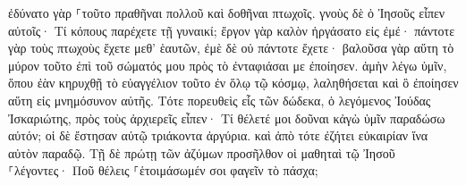 \documentclass{openreader}
\begin{document}
ἐδύνατο γὰρ ⸀τοῦτο πραθῆναι πολλοῦ καὶ δοθῆναι πτωχοῖς. 
γνοὺς δὲ ὁ Ἰησοῦς εἶπεν αὐτοῖς· Τί κόπους παρέχετε τῇ γυναικί; ἔργον γὰρ καλὸν ἠργάσατο εἰς ἐμέ· 
πάντοτε γὰρ τοὺς πτωχοὺς ἔχετε μεθ’ ἑαυτῶν, ἐμὲ δὲ οὐ πάντοτε ἔχετε· 
βαλοῦσα γὰρ αὕτη τὸ μύρον τοῦτο ἐπὶ τοῦ σώματός μου πρὸς τὸ ἐνταφιάσαι με ἐποίησεν. 
ἀμὴν λέγω ὑμῖν, ὅπου ἐὰν κηρυχθῇ τὸ εὐαγγέλιον τοῦτο ἐν ὅλῳ τῷ κόσμῳ, λαληθήσεται καὶ ὃ ἐποίησεν αὕτη εἰς μνημόσυνον αὐτῆς. 
Τότε πορευθεὶς εἷς τῶν δώδεκα, ὁ λεγόμενος Ἰούδας Ἰσκαριώτης, πρὸς τοὺς ἀρχιερεῖς 
εἶπεν· Τί θέλετέ μοι δοῦναι κἀγὼ ὑμῖν παραδώσω αὐτόν; οἱ δὲ ἔστησαν αὐτῷ τριάκοντα ἀργύρια. 
καὶ ἀπὸ τότε ἐζήτει εὐκαιρίαν ἵνα αὐτὸν παραδῷ. 
Τῇ δὲ πρώτῃ τῶν ἀζύμων προσῆλθον οἱ μαθηταὶ τῷ Ἰησοῦ ⸀λέγοντες· Ποῦ θέλεις ⸀ἑτοιμάσωμέν σοι φαγεῖν τὸ πάσχα; 
\end{document}
